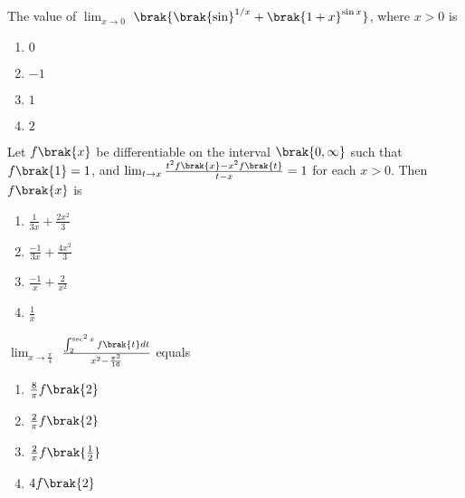 \item %

	The value of $\lim_{x \to 0}$ $\brak{ \brak{\sin}^{1/x} + \brak{1+x}^{\sin x}}$, where $x > 0$ is \hfill{}
    \begin{enumerate}
     \item $0$
     \item $-1$
     \item $1$
     \item $2$\\
    \end{enumerate}

\newpage
\item %

	Let $f\brak{x}$ be differentiable on the interval $\brak{0,\infty}$ such that $f\brak{1}=1$, and $\lim_{t \to x} \frac{t^2f\brak{x}-x^2f\brak{t}}{t-x}=1$ for each $x>0$. Then $f\brak{x}$ is \hfill{}
    \begin{enumerate}
     \item $\frac{1}{3x}+\frac{2x^2}{3}$\\
     \item $\frac{-1}{3x}+\frac{4x^2}{3}$\\
     \item $\frac{-1}{x}+\frac{2}{x^2}$\\
     \item $\frac{1}{x}$\\
    \end{enumerate}


\item %

	$\lim_{x \to \frac{\pi}{4}}$ $ \frac{\int_2^{\sec^2 x} f\brak{t} dt}{x^2-\frac{\pi^2}{16}}$ equals \hfill{}
    \begin{enumerate}
	    \item $\frac{8}{\pi}f\brak{2}$
     \item $\frac{2}{\pi}f\brak{2}$
     \item $\frac{2}{\pi}f\brak{\frac{1}{2}}$
     \item $4f\brak{2}$\\
    \end{enumerate}




